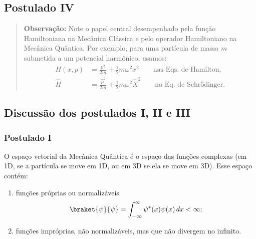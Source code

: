 \subsection*{Postulado IV}


\begin{quote}
\textbf{Observação:} Note o papel central desempenhado pela função Hamiltoniana na Mecânica Clássica e pelo operador Hamiltoniano na Mecânica Quântica. Por exemplo, para uma partícula de massa $m$ submetida a um potencial harmônico, usamos:
\begin{align}
H(x,p) &= \frac{p^2}{2m} + \frac{1}{2}m\omega^2 x^2 \qquad \text{nas Eqs. de Hamilton,}\\
\hat{H} &= \frac{\hat{P}^2}{2m} + \frac{1}{2}m\omega^2 \hat{X}^2 \qquad \text{na Eq. de Schrödinger.}
\end{align}
\end{quote}

\subsection*{Discussão dos postulados I, II e III}

\subsubsection*{Postulado I}

O espaço vetorial da Mecânica Quântica é o espaço das funções complexas (em 1D, se a partícula se move em 1D, ou em 3D se ela se move em 3D). Esse espaço contém:

\begin{enumerate}
\item[i)] funções próprias ou normalizáveis
\begin{equation}
\braket{\psi}{\psi} = \int_{-\infty}^{\infty} \psi^*(x)\psi(x)\, dx < \infty;
\end{equation}
\item[ii)] funções impróprias, não normalizáveis, mas que não divergem no infinito.
\end{enumerate}

